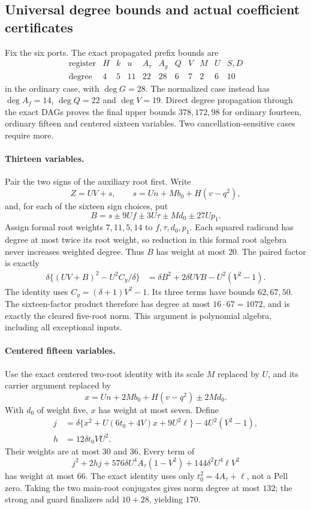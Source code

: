 \documentclass[11pt]{article}
\begin{document}
\subsection{Universal degree bounds and actual coefficient certificates}
Fix the six ports. The exact propagated prefix bounds are
\[
\begin{array}{c|rrrrrrrrrr}
\text{register}&H&k&u&A_\tau&A_g&Q&V&M&U&S,D\\\hline
\text{degree}&4&5&11&22&28&6&7&2&6&10
\end{array}
\]
in the ordinary case, with $\deg G=28$. The normalized case instead has
$\deg A_f=14$, $\deg Q=22$ and $\deg V=19$.
Direct degree propagation through the exact DAGs proves the final upper
bounds $378,172,98$ for ordinary fourteen, ordinary fifteen and centered
sixteen variables. Two cancellation-sensitive cases require more.

\paragraph{Thirteen variables.}
Pair the two signs of the auxiliary root first. Write
\[
 Z=UV+s,\qquad s=Un+Mb_0+H(v-q^2),
\]
and, for each of the sixteen sign choices, put
\[
 B=s\mathbin{\pm}9Uf\mathbin{\pm}3U\tau
     \mathbin{\pm}Md_0\mathbin{\pm}27Up_1.
\]
Assign formal root weights $7,11,5,14$ to $f,\tau,d_0,p_1$.
Each squared radicand has degree at most twice its root weight, so
reduction in this formal root algebra never increases weighted degree.
Thus $B$ has weight at most $20$. The paired factor is exactly
\begin{align*}
 \delta\{(UV+B)^2-U^2C_y/\delta\}
 &=\delta B^2+2\delta UVB-U^2(V^2-1).
\end{align*}
The identity uses $C_y=(\delta+1)V^2-1$. Its three terms have bounds
$62,67,50$. The sixteen-factor product therefore has degree at most
$16\cdot67=1072$, and is exactly the cleared five-root norm.
This argument is polynomial algebra, including all exceptional inputs.

\paragraph{Centered fifteen variables.}
Use the exact centered two-root identity with its scale $M$ replaced by
$U$, and its carrier argument replaced by
\[
 x=Un+2Mb_0+H(v-q^2)\mathbin{\pm}2Md_0.
\]
With $d_0$ of weight five, $x$ has weight at most seven. Define
\begin{align*}
 j&=\delta\{x^2+U(6t_0+4V)x+9U^2\ell\}
      -4U^2(V^2-1),\\
 h&=12\delta t_0VU^2.
\end{align*}
Their weights are at most $30$ and $36$. Every term of
\[
 j^2+2hj+576\delta U^4A_\tau(1-V^2)
       +144\delta^2U^4\ell V^2
\]
has weight at most $66$. The exact identity uses only
$t_0^2=4A_\tau+\ell$, not a Pell zero. Taking the two main-root
conjugates gives norm degree at most $132$; the strong and guard
finalizers add $10+28$, yielding $170$.
\end{document}
